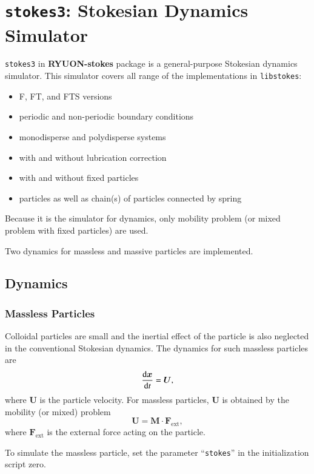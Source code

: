 \documentclass{book}
\begin{document}
\section{{\tt stokes3}:
  Stokesian Dynamics Simulator}
{\tt stokes3} in {\bf RYUON-stokes} package is a general-purpose 
Stokesian dynamics simulator.
This simulator covers all range of the implementations in {\tt libstokes}:
\begin{itemize}
\item F, FT, and FTS versions
\item periodic and non-periodic boundary conditions
\item monodisperse and polydisperse systems
\item with and without lubrication correction
\item with and without fixed particles
\item particles as well as chain(s) of particles connected by spring
\end{itemize}
Because it is the simulator for dynamics,
only mobility problem (or mixed problem with fixed particles) are used.

Two dynamics for massless and massive particles are implemented.

\subsection{Dynamics}
\subsubsection{Massless Particles}
Colloidal particles are small and the inertial effect of the particle 
is also neglected in the conventional Stokesian dynamics.
The dynamics for such massless particles are
\begin{equation}
  \frac{{\rm d}\bm{x}}{{\rm d}t}
  =
  \bm{U}
  ,
\end{equation}
where $\bm{U}$ is the particle velocity.
For massless particles, $\bm{U}$ is obtained
by the mobility (or mixed) problem
\begin{equation}
  \bm{U}
  =
  \bm{M}\cdot\bm{F}_{\text{ext}}
  ,
\end{equation}
where $\bm{F}_{\text{ext}}$ is the external force acting on the particle.

To simulate the massless particle, set the parameter ``{\tt stokes}'' 
in the initialization script zero.
\end{document}
